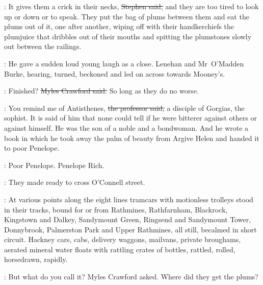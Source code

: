 
\Stephen:
It gives them a crick in their necks,
\sout{Stephen said,}
and they are too tired to look up or down or to speak.
They put the bag of plums between them and eat the plums out of it,
one after another,
wiping off with their handkerchiefs the plumjuice
that dribbles out of their mouths
and spitting the plumstones slowly out between the railings.

:
He gave a sudden loud young laugh as a close.
Lenehan and Mr~O'Madden Burke,
hearing,
turned,
beckoned
and led on across towards Mooney's.

\crawford:
Finished?
\sout{Myles Crawford said.}
So long as they do no worse.



\machugh:
You remind me of Antisthenes,
\sout{the professor said,}
a disciple of Gorgias, the sophist.
It is said of him that none could tell
if he were bitterer against others or against himself.
He was the son of a noble and a bondwoman.
And he wrote a book
in which he took away the palm of beauty from Argive Helen
and handed it to poor Penelope.

\StephenInt:
Poor Penelope.
Penelope Rich.

:
They made ready to cross O'Connell street.



:
At various points along the eight lines
tramcars with motionless trolleys stood in their tracks,
bound for or from
Rathmines,
Rathfarnham,
Blackrock,
Kingstown and Dalkey,
Sandymount Green,
Ringsend and
Sandymount Tower,
Donnybrook,
Palmerston Park and Upper Rathmines,
all still,
becalmed in short circuit.
Hackney cars,
cabs,
delivery
waggons,
mailvans,
private broughams,
aerated mineral water floats with rattling crates of bottles,
rattled,
rolled,
horsedrawn,
rapidly.




\crawford:
But what do you call it?
Myles Crawford asked.
Where did they get the plums?



